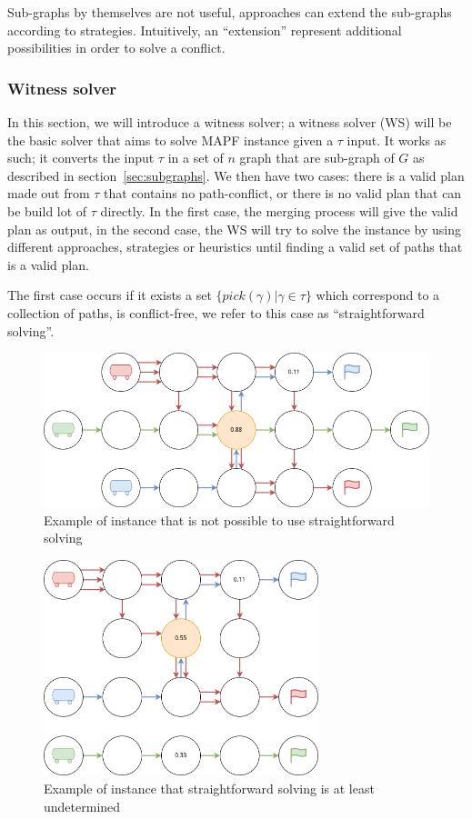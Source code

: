 Sub-graphs by themselves are not useful, approaches can extend the sub-graphs according to strategies. Intuitively, an ``extension'' represent additional possibilities in order to solve a conflict. 

\subsubsection{Witness solver}

In this section, we will introduce a witness solver; a witness solver (WS) will be the basic solver that aims to solve MAPF instance given a \(\tau\) input. It works as such; it converts the input \(\tau\) in a set of \(n\) graph that are sub-graph of \(G\) as described in section~\ref{sec:subgraphs}. We then have two cases: there is a valid plan made out from \(\tau\) that contains no path-conflict, or there is no valid plan that can be build lot of \(\tau\) directly. In the first case, the merging process will give the valid plan as output, in the second case, the WS will try to solve the instance by using different approaches, strategies or heuristics until finding a valid set of paths that is a valid plan.

The first case occurs if it exists a set \(\{pick(\gamma) | \gamma \in \tau\}\) which correspond to a collection of paths, is conflict-free, we refer to this case as ``straightforward solving''.

\begin{figure}[H]
  \centering
  \caption{Example of instance that is not possible to use straightforward solving}\label{img:heatmap_sf_solving}
  \includegraphics[width=\widthimg]{img/heatmap_sf_solving.drawio.png}
\end{figure}

\begin{figure}[H]
  \centering
  \caption{Example of instance that straightforward solving is at least undetermined}\label{img:heatmap_sf_solving_possible}
  \includegraphics[width=8cm]{img/heatmap_sf_solving_possible.drawio.png}
\end{figure}

